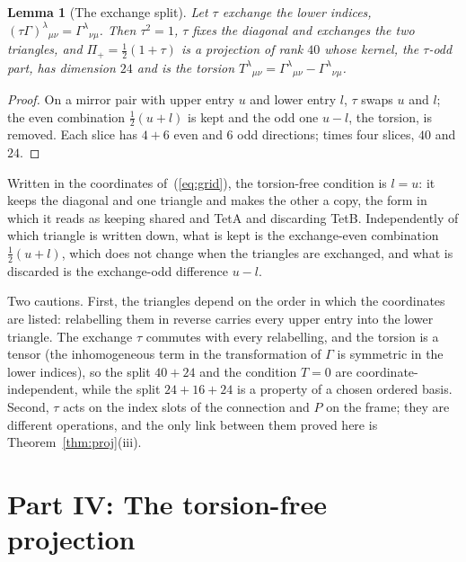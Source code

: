 \documentclass[twocolumn]{iopjournal}
\newtheorem{lemma}{Lemma}
\theoremstyle{definition}
\theoremstyle{remark}
\begin{document}
\begin{lemma}[The exchange split]
\label{lem:tau}
Let $\tau$ exchange the lower indices,
$(\tau\Gamma)^\lambda{}_{\mu\nu} = \Gamma^\lambda{}_{\nu\mu}$. Then
$\tau^2 = 1$, $\tau$ fixes the diagonal and exchanges the two
triangles, and $\Pi_+ = \tfrac12(1+\tau)$ is a projection of rank
$40$ whose kernel, the $\tau$-odd part, has dimension $24$ and is the
torsion $T^\lambda{}_{\mu\nu} = \Gamma^\lambda{}_{\mu\nu}
- \Gamma^\lambda{}_{\nu\mu}$.
\end{lemma}

\begin{proof}
On a mirror pair with upper entry $u$ and lower entry $l$, $\tau$
swaps $u$ and $l$; the even combination $\tfrac12(u+l)$ is kept and
the odd one $u - l$, the torsion, is removed. Each slice has $4 + 6$
even and $6$ odd directions; times four slices, $40$ and $24$.
\end{proof}

\noindent
Written in the coordinates of~(\ref{eq:grid}), the torsion-free
condition is $l = u$: it keeps the diagonal and one triangle and
makes the other a copy, the form in which it reads as keeping shared
and TetA and discarding TetB. Independently of which triangle is
written down, what is kept is the exchange-even combination
$\tfrac12(u+l)$, which does not change when the triangles are
exchanged, and what is discarded is the exchange-odd difference
$u - l$.

Two cautions. First, the triangles depend on the order in which the
coordinates are listed: relabelling them in reverse carries every
upper entry into the lower triangle. The exchange $\tau$ commutes
with every relabelling, and the torsion is a tensor (the
inhomogeneous term in the transformation of $\Gamma$ is symmetric in
the lower indices), so the split $40 + 24$ and the condition $T = 0$
are coordinate-independent, while the split $24 + 16 + 24$ is a
property of a chosen ordered basis. Second, $\tau$ acts on the index
slots of the connection and $P$ on the frame; they are different
operations, and the only link between them proved here is
Theorem~\ref{thm:proj}(iii).


\section*{Part IV: The torsion-free projection}
\end{document}
